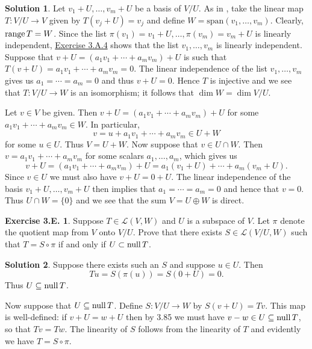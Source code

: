 \documentclass[12pt]{article}
\theoremstyle{definition}
\theoremstyle{exercise}
\newtheorem{exercise}{Exercise 3.E.}
\theoremstyle{solution}
\newtheorem*{solution}{Solution}
\newcommand{\lmap}{\mathcal{L}}
\newcommand{\Span}{\text{span}}
\newcommand{\Null}{\text{null\,}}
\newcommand{\Range}{\text{range\,}}
\begin{document}
\begin{solution}
    Let \( v_1 + U, \ldots, v_m + U \) be a basis of \( V/U \). As in , take the linear map \( T : V/U \to V \) given by \( T(v_j + U) = v_j \) and define \( W = \Span(v_1, \ldots, v_m) \). Clearly, \( \Range T = W \). Since the list \( \pi(v_1) = v_1 + U, \ldots, \pi(v_m) = v_m + U \) is linearly independent, \href{https://lew98.github.io/Mathematics/LADR_Section_3_A_Exercises.pdf}{Exercise 3.A.4} shows that the list \( v_1, \ldots, v_m \) is linearly independent. Suppose that \( v + U = (a_1 v_1 + \cdots + a_m v_m) + U \) is such that \( T(v + U) = a_1 v_1 + \cdots + a_m v_m = 0 \). The linear independence of the list \( v_1, \ldots, v_m \) gives us \( a_1 = \cdots = a_m = 0 \) and thus \( v + U = 0 \). Hence \( T \) is injective and we see that \( T : V/U \to W \) is an isomorphism; it follows that \( \dim W = \dim V/U \).

    Let \( v \in V \) be given. Then \( v + U = (a_1 v_1 + \cdots + a_m v_m) + U \) for some \( a_1 v_1 + \cdots + a_m v_m \in W \). In particular,
    \[
        v = u + a_1 v_1 + \cdots + a_m v_m \in U + W
    \]
    for some \( u \in U \). Thus \( V = U + W \). Now suppose that \( v \in U \cap W \). Then \( v = a_1 v_1 + \cdots + a_m v_m \) for some scalars \( a_1, \ldots, a_m \), which gives us
    \[
        v + U = (a_1 v_1 + \cdots + a_m v_m) + U = a_1 (v_1 + U) + \cdots + a_m (v_m + U).
    \]
    Since \( v \in U \) we must also have \( v + U = 0 + U \). The linear independence of the basis \( v_1 + U, \ldots, v_m + U \) then implies that \( a_1 = \cdots = a_m = 0 \) and hence that \( v = 0 \). Thus \( U \cap W = \{ 0 \} \) and we see that the sum \( V = U \oplus W \) is direct.
\end{solution}

\begin{exercise}
\label{ex:18}
    Suppose \( T \in \lmap(V, W) \) and \( U \) is a subspace of \( V \). Let \( \pi \) denote the quotient map from \( V \) onto \( V/U \). Prove that there exists \( S \in \lmap(V/U, W) \) such that \( T = S \circ \pi \) if and only if \( U \subset \Null T \).
\end{exercise}

\begin{solution}
    Suppose there exists such an \( S \) and suppose \( u \in U \). Then
    \[
        Tu = S(\pi(u)) = S(0 + U) = 0.
    \]
    Thus \( U \subseteq \Null T \).

    Now suppose that \( U \subseteq \Null T \). Define \( S : V/U \to W \) by \( S(v + U) = Tv \). This map is well-defined: if \( v + U = w + U \) then by 3.85 we must have \( v - w \in U \subseteq \Null T \), so that \( Tv = Tw \). The linearity of \( S \) follows from the linearity of \( T \) and evidently we have \( T = S \circ \pi \).
\end{solution}
\end{document}
